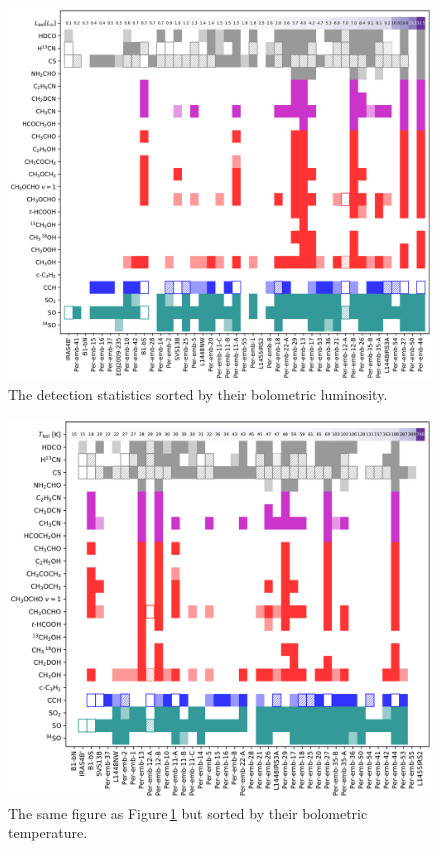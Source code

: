\documentclass[twocolumn]{aastex62}
\begin{document}
\begin{figure}[htbp!]
  \centering
  \includegraphics[width=\textwidth]{stats_sorted_by_lbol.pdf}
  \caption{The detection statistics sorted by their bolometric luminosity.}
  \label{fig:stats}
\end{figure}

\renewcommand{\thefigure}{\arabic{figure} (Cont.)}
\addtocounter{figure}{-1}
\begin{figure}[htbp!]
  \includegraphics[width=\textwidth]{stats_sorted_by_tbol.pdf}
  \caption{The same figure as Figure\,\ref{fig:stats} but sorted by their bolometric temperature.}
\end{figure}
\addtocounter{figure}{-1}
\end{document}
